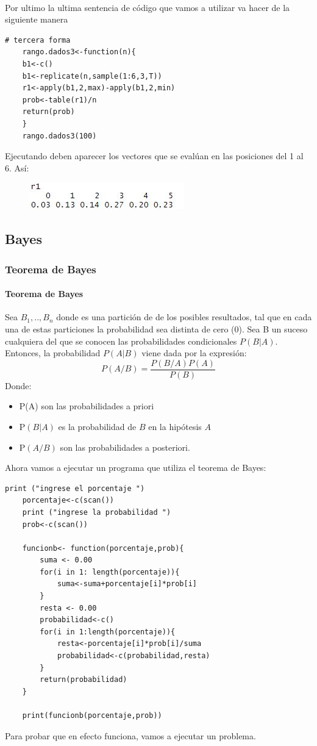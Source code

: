 \documentclass[12pt,hidelinks]{article}
\begin{document}
\paragraph{} Por ultimo la ultima sentencia de código que vamos a utilizar va hacer de la siguiente manera
\begin{lstlisting}[frame=single]
	# tercera forma
	rango.dados3<-function(n){
	b1<-c()
	b1<-replicate(n,sample(1:6,3,T))
	r1<-apply(b1,2,max)-apply(b1,2,min)
	prob<-table(r1)/n
	return(prob)
	}
	rango.dados3(100)
\end{lstlisting}
Ejecutando deben aparecer los vectores que se evalúan en las posiciones del 1 al 6. Así:
\begin{figure}[h!]
	\centering
	\includegraphics[width=0.5\linewidth]{images/3/probabilidad_condicionada2.JPG}
\end{figure}
\subsection{Bayes}
\subsubsection{Teorema de Bayes}
\paragraph{Teorema de Bayes} Sea $B_1,..,B_n$ donde es una partición de de los posibles resultados, tal que en cada una de estas particiones la probabilidad sea distinta de cero (0). Sea B un suceso cualquiera del que se conocen las probabilidades condicionales  $P(B|A)$. Entonces, la probabilidad $P(A|B)$ viene dada por la expresión:
\[
P(A/B)=\frac{P(B/A)P(A)}{P(B)}
\]
Donde:
\begin{itemize}
	\item P(A) son las probabilidades a priori
	\item P$(B|A)$ es la probabilidad de $B$ en la hipótesis $A$
	\item P$(A/B)$ son las probabilidades a posteriori. 
\end{itemize}
Ahora vamos a ejecutar un programa que utiliza el teorema de Bayes:
\begin{lstlisting}[frame=single]
	print ("ingrese el porcentaje ")
	porcentaje<-c(scan())
	print ("ingrese la probabilidad ")
	prob<-c(scan())
	
	funcionb<- function(porcentaje,prob){
		suma <- 0.00
		for(i in 1: length(porcentaje)){
			suma<-suma+porcentaje[i]*prob[i]
		}
		resta <- 0.00
		probabilidad<-c()
		for(i in 1:length(porcentaje)){
			resta<-porcentaje[i]*prob[i]/suma
			probabilidad<-c(probabilidad,resta)
		}
		return(probabilidad)
	}
	
	print(funcionb(porcentaje,prob))
\end{lstlisting}
Para probar que en efecto funciona, vamos a ejecutar un problema.
\end{document}

